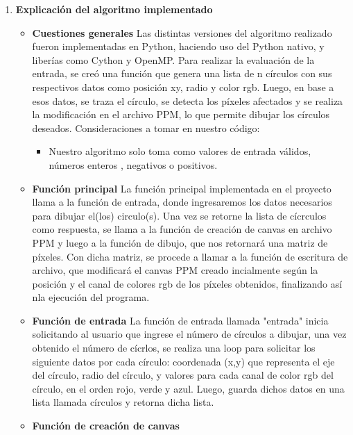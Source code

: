 \documentclass[12pt, letterpaper]{article}
\begin{document}
\vspace{10mm}
\begin{flushleft}
    \begin{enumerate}
        \item \textbf{Explicación del algoritmo implementado}
        \begin{itemize}
            \item \textbf{Cuestiones generales}
            Las distintas versiones del algoritmo realizado fueron implementadas en Python, haciendo uso del Python nativo, y liberías como Cython y OpenMP.
            Para realizar la evaluación de la entrada, se creó una función que genera una lista de n círculos con sus respectivos datos como posición xy, radio y color rgb. Luego, en base a esos datos, se traza el círculo, se detecta los píxeles afectados y se realiza la modificación en el archivo PPM, lo que permite dibujar los círculos deseados.
            Consideraciones a tomar en nuestro código:
        \begin{itemize}
            \item Nuestro algoritmo solo toma como valores de entrada válidos, números enteros , negativos o positivos.
        \end{itemize}
            \item \textbf{Función principal}
            La función principal implementada en el proyecto llama a la función de entrada, donde ingresaremos los datos necesarios para dibujar el(los) circulo(s). Una vez se retorne la lista de cícrculos como respuesta, se llama a la función de creación de canvas en archivo PPM y luego a la función de dibujo, que nos retornará una matriz de píxeles. Con dicha matriz, se procede a llamar a la función de escritura de archivo, que modificará el canvas PPM creado incialmente según la posición y el canal de colores rgb de los píxeles obtenidos, finalizando así nla ejecución del programa.
            \item \textbf{Función de entrada}
            La función de entrada llamada "entrada" inicia solicitando al usuario que ingrese el número de círculos a dibujar, una vez obtenido el número de cícrlos, se realiza una loop para solicitar los siguiente datos por cada círculo: coordenada (x,y) que representa el eje del círculo, radio del círculo, y valores para cada canal de color rgb del círculo, en el orden rojo, verde y azul. Luego, guarda dichos datos en una lista llamada círculos y retorna dicha lista.
            \item \textbf{Función de creación de canvas}

\end{itemize}
\end{enumerate}
\end{flushleft}
\end{document}
